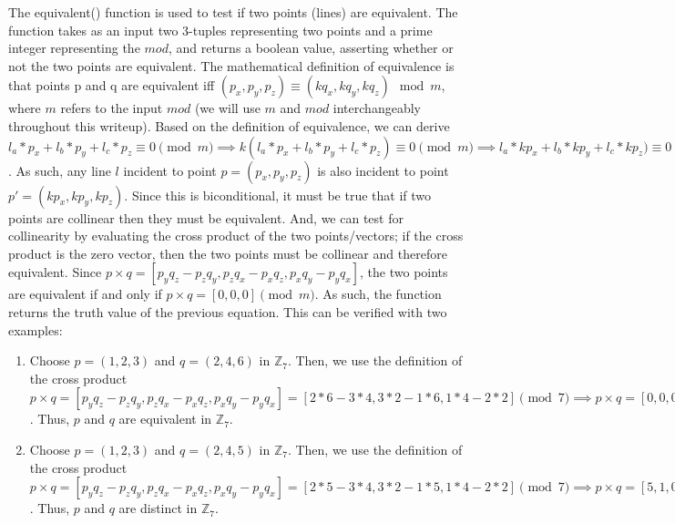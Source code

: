 \documentclass{article}
\begin{document}
    The equivalent() function is used to test if two points (lines) are equivalent. The function takes as an input two 3-tuples representing two points and a prime integer representing the $mod$, and returns a boolean value, asserting whether or not the two points are equivalent. The mathematical definition of equivalence is that points p and q are equivalent iff $(p_x, p_y, p_z) \equiv (kq_x, kq_y, kq_z) \mod m$, where $m$ refers to the input $mod$ (we will use $m$ and $mod$ interchangeably throughout this writeup). Based on the definition of equivalence, we can derive $l_a*p_x + l_b*p_y + l_c*p_z \equiv 0 \pmod{m} \implies k(l_a*p_x + l_b*p_y + l_c*p_z) \equiv 0 \pmod{m} \implies l_a*kp_x + l_b*kp_y + l_c*kp_z) \equiv 0 \pmod{m}$. As such, any line $l$ incident to point $p = (p_x, p_y, p_z)$ is also incident to point $p' = (kp_x, kp_y, kp_z)$. Since this is biconditional, it must be true that if two points are collinear then they must be equivalent. And, we can test for collinearity by evaluating the cross product of the two points/vectors; if the cross product is the zero vector, then the two points must be collinear and therefore equivalent. Since $p \times q = [p_yq_z - p_zq_y, p_zq_x - p_xq_z, p_xq_y - p_yq_x]$, the two points are equivalent if and only if $p \times q = [0, 0, 0] \pmod{m}$. As such, the function returns the truth value of the previous equation. This can be verified with two examples:
    \begin{enumerate}[label=(\alph*)]
        \item Choose $p = (1, 2, 3)$ and $q = (2, 4, 6)$ in $\mathbb{Z}_7$. Then, we use the definition of the cross product $p \times q = [p_yq_z - p_zq_y, p_zq_x - p_xq_z, p_xq_y - p_yq_x] = [2*6 - 3*4, 3*2 - 1*6, 1*4 - 2*2] \pmod{7} \implies p \times q = [0, 0, 0]$. Thus, $p$ and $q$ are equivalent in $\mathbb{Z}_7$.
        
        \item Choose $p = (1, 2, 3)$ and $q = (2, 4, 5)$ in $\mathbb{Z}_7$. Then, we use the definition of the cross product $p \times q = [p_yq_z - p_zq_y, p_zq_x - p_xq_z, p_xq_y - p_yq_x] = [2*5 - 3*4, 3*2 - 1*5, 1*4 - 2*2] \pmod{7} \implies p \times q = [5, 1, 0] \neq [0, 0, 0]$. Thus, $p$ and $q$ are distinct in $\mathbb{Z}_7$.
    \end{enumerate}\\
\end{document}
